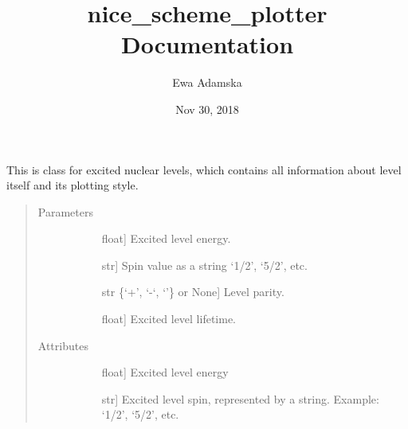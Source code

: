 \documentclass[letterpaper,10pt,english]{sphinxmanual}
\title{nice\_scheme\_plotter Documentation}
\date{Nov 30, 2018}
\author{Ewa Adamska}
\begin{document}
\pagestyle{empty}
\maketitle
\pagestyle{plain}
\sphinxtableofcontents
\pagestyle{normal}
\label{\detokenize{nice_scheme_plotter::doc}}

\label{\detokenize{nice_scheme_plotter:module-database_reader}}

\begin{fulllineitems}
\label{\detokenize{nice_scheme_plotter:database_reader.Level}}
This is class for excited nuclear levels, which contains all information
about level itself and its plotting style.
\begin{quote}\begin{description}
\item[{Parameters}] \leavevmode\begin{description}
\item[{}] \leavevmode{[}float{]}
Excited level energy.

\item[{}] \leavevmode{[}str{]}
Spin value as a string ‘1/2’, ‘5/2’, etc.

\item[{}] \leavevmode{[}str \{‘+’, ‘-‘, ‘’\} or None{]}
Level parity.

\item[{}] \leavevmode{[}float{]}
Excited level lifetime.

\end{description}

\item[{Attributes}] \leavevmode\begin{description}
\item[{}] \leavevmode{[}float{]}
Excited level energy

\item[{}] \leavevmode{[}str{]}
Excited level spin, represented by a string. Example: ‘1/2’, ‘5/2’, etc.


\end{description}
\end{description}
\end{quote}
\end{fulllineitems}
\end{document}
